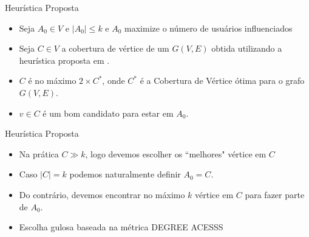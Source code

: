 \documentclass[t,14pt,mathserif,xcolor=table]{beamer}
\begin{document}

\begin{frame}{Heurística Proposta}

	\begin{itemize}
		\item  Seja $A_0 \in V$ e $|A_0| \leq k$ e $A_0$ maximize o número de usuários influenciados
		\item  Seja $C \in V$ a cobertura de vértice de um $G(V,E)$ obtida utilizando a heurística proposta em \cite{Cormen:2009:IAT:1614191}.
		\item $C$ é no máximo $ 2 \times C^{*}$, onde $C^{*}$ é a Cobertura de Vértice ótima para o grafo $G(V,E)$.
		\item $v \in C$ é um bom candidato para estar em $A_0$.
		
	\end{itemize}
	

	
\end{frame}


\begin{frame}{Heurística Proposta}

	\begin{itemize}
		\item Na prática $C \gg k$, logo devemos escolher os ``melhores"{} vértice em $C$
		\item Caso $|C| = k$ podemos naturalmente definir $A_{0} = C$.
		\item Do contrário, devemos encontrar no máximo $k$ vértice em $C$ para fazer parte de $A_{0}$.
		\item Escolha gulosa baseada na métrica \textsc{DEGREE ACESSS}{}
	\end{itemize}
	
\end{frame}

\end{document}
